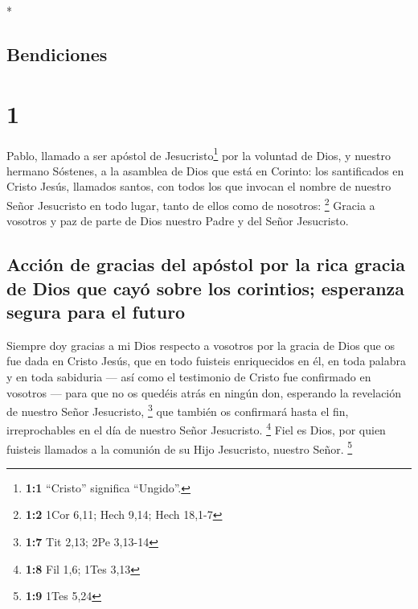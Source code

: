 \begin{paracol}{2} \switchcolumn[0]*

\hypertarget{bendiciones}{%
\subsection{Bendiciones}\label{bendiciones}}

\hypertarget{section}{%
\section{1}\label{section}}

 Pablo, llamado a ser apóstol de Jesucristo\footnote{\textbf{1:1}
  ``Cristo'' significa ``Ungido''.} por la voluntad de Dios, y nuestro
hermano Sóstenes,  a la asamblea de Dios que está en
Corinto: los santificados en Cristo Jesús, llamados santos, con todos
los que invocan el nombre de nuestro Señor Jesucristo en todo lugar,
tanto de ellos como de nosotros: \footnote{\textbf{1:2} 1Cor 6,11; Hech
  9,14; Hech 18,1-7}  Gracia a vosotros y paz de parte de
Dios nuestro Padre y del Señor Jesucristo.

\hypertarget{acciuxf3n-de-gracias-del-apuxf3stol-por-la-rica-gracia-de-dios-que-cayuxf3-sobre-los-corintios-esperanza-segura-para-el-futuro}{%
\subsection{Acción de gracias del apóstol por la rica gracia de Dios que
cayó sobre los corintios; esperanza segura para el
futuro}\label{acciuxf3n-de-gracias-del-apuxf3stol-por-la-rica-gracia-de-dios-que-cayuxf3-sobre-los-corintios-esperanza-segura-para-el-futuro}}

 Siempre doy gracias a mi Dios respecto a vosotros por la
gracia de Dios que os fue dada en Cristo Jesús,  que en
todo fuisteis enriquecidos en él, en toda palabra y en toda sabiduria
---  así como el testimonio de Cristo fue confirmado en
vosotros ---  para que no os quedéis atrás en ningún don,
esperando la revelación de nuestro Señor Jesucristo, \footnote{\textbf{1:7}
  Tit 2,13; 2Pe 3,13-14}  que también os confirmará hasta
el fin, irreprochables en el día de nuestro Señor Jesucristo.
\footnote{\textbf{1:8} Fil 1,6; 1Tes 3,13}  Fiel es Dios,
por quien fuisteis llamados a la comunión de su Hijo Jesucristo, nuestro
Señor. \footnote{\textbf{1:9} 1Tes 5,24}


\end{paracol}
